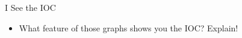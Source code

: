 \begin{exercise}{I See the IOC \Coffeecup \Coffeecup}
\begin{itemize}
\begin{center}
\end{center}
\item What feature of those graphs shows you the IOC? Explain!
\vspace*{1in}
\end{itemize}
\end{exercise}
